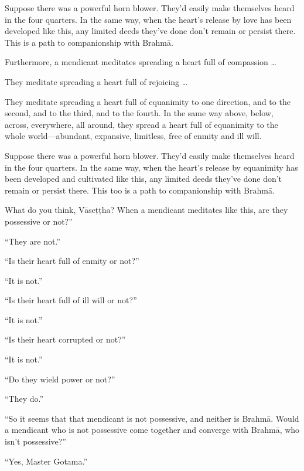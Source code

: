 \documentclass[12pt,openany]{book}%
\begin{document}
Suppose there was a powerful horn blower. They’d easily make themselves heard in the four quarters. In the same way, when the heart’s release by love has been developed like this, any limited deeds they’ve done don’t remain or persist there. This is a path to companionship with \textsanskrit{Brahmā}. 

Furthermore, a mendicant meditates spreading a heart full of compassion … 

They meditate spreading a heart full of rejoicing … 

They meditate spreading a heart full of equanimity to one direction, and to the second, and to the third, and to the fourth. In the same way above, below, across, everywhere, all around, they spread a heart full of equanimity to the whole world—abundant, expansive, limitless, free of enmity and ill will. 

Suppose there was a powerful horn blower. They’d easily make themselves heard in the four quarters. In the same way, when the heart’s release by equanimity has been developed and cultivated like this, any limited deeds they’ve done don’t remain or persist there. This too is a path to companionship with \textsanskrit{Brahmā}. 

What do you think, \textsanskrit{Vāseṭṭha}? When a mendicant meditates like this, are they possessive or not?” 

“They are not.” 

“Is their heart full of enmity or not?” 

“It is not.” 

“Is their heart full of ill will or not?” 

“It is not.” 

“Is their heart corrupted or not?” 

“It is not.” 

“Do they wield power or not?” 

“They do.” 

“So it seems that that mendicant is not possessive, and neither is \textsanskrit{Brahmā}. Would a mendicant who is not possessive come together and converge with \textsanskrit{Brahmā}, who isn’t possessive?” 

“Yes, Master Gotama.” 
\end{document}
